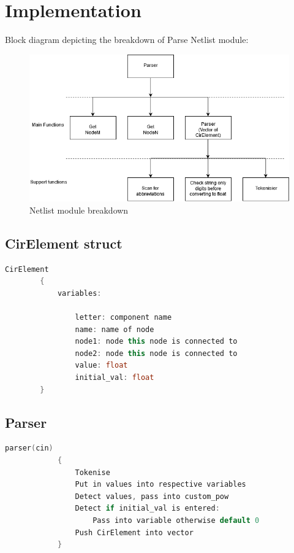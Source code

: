 \documentclass[a4paper, titlepage]{article}
\begin{document}
    \section{Implementation}
    Block diagram depicting the breakdown of Parse Netlist module:
    \begin{center}
        \begin{figure}[h]
        \includegraphics[width=\linewidth]{Netlist breakdown}
        \caption{Netlist module breakdown}
        \label{fig:Netlist breakdown}
        \end{figure}
    \end{center}
    
    \subsection{CirElement struct}
    \begin{lstlisting}[language=C++]
        CirElement 
        {
            variables:
    
                letter: component name
                name: name of node
                node1: node this node is connected to 
                node2: node this node is connected to
                value: float
                initial_val: float
        }
    \end{lstlisting}
    \subsection{Parser}
    \begin{lstlisting}[language=C++]
        parser(cin)
            {
                Tokenise
                Put in values into respective variables
                Detect values, pass into custom_pow
                Detect if initial_val is entered:
                    Pass into variable otherwise default 0
                Push CirElement into vector
            }
    \end{lstlisting}
\end{document}
